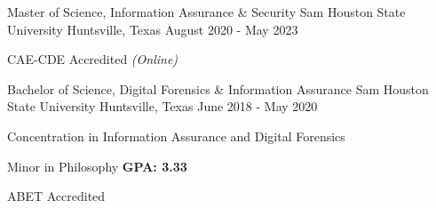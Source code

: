 \begin{cventries}

  \cventry
	{Master of Science, Information Assurance \& Security} %
	{Sam Houston State University} %
	{Huntsville, Texas} %
	{August 2020 - May 2023 } %
	{
    \begin{cvitems}
      \item {CAE-CDE Accredited \hfill \textit{(Online)}}
    \end{cvitems}
  }

  \cventry
    {Bachelor of Science, Digital Forensics \& Information Assurance} %
    {Sam Houston State University} %
    {Huntsville, Texas} %
    {June 2018 - May 2020} %
    {
      \begin{cvitems} %
        \item{Concentration in Information Assurance and Digital Forensics}
        \item{Minor in Philosophy \hfill \textbf{GPA: 3.33}}
        \item {ABET Accredited}
      \end{cvitems}
    }
\end{cventries}

